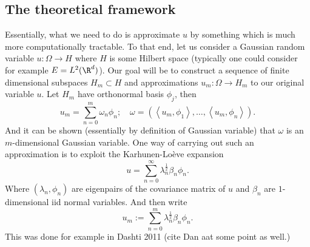 \documentclass[12pt]{article}
\newcommand{\br}[1]{\left\langle#1\right\rangle}
\begin{document}
\begin{CJK*}{UTF8}{gbsn}
	\section{The theoretical framework}
	Essentially, what we need to do is approximate $u$ by something which is much more computationally tractable. To that end, let us consider a Gaussian random variable $u:\Omega\to H$ where $H$ is some Hilbert space (typically one could consider for example $E=L^2(\R^d)$). Our goal will be to construct a sequence of finite dimensional subspaces $H_m\subset H$ and approximations $u_m:\Omega\to H_m$ to our original variable $u$. Let $H_m$ have orthonormal basis $\phi_j$, then
	\begin{equation*}
		u_m=\sum_{n=0}^{m} \omega_n\phi_n;\quad \omega=(\br{u_m,\phi_1},\ldots,\br{u_m,\phi_n}).
	\end{equation*}
	And it can be shown (essentially by definition of Gaussian variable) that $\omega$ is an $m$-dimensional Gaussian variable. One way of carrying out such an approximation is to exploit the Karhunen-Loève expansion
	\begin{equation*}
		u=\sum_{n=0}^{\infty} \lambda _n^\frac{1}{2}\beta _n\phi_n.
	\end{equation*}
	Where $(\lambda _n,\phi_n)$ are eigenpairs of the covariance matrix of $u$ and $\beta _n$ are $1$-dimensional iid normal variables. And then write
	\begin{equation*}
		u_m:=\sum_{n=0}^{m}\lambda _n^\frac{1}{2}\beta _n\phi_n.
	\end{equation*}
	This was done for example in Dashti 2011 (cite Dan aat some point as well.)
\end{CJK*}




\end{document}
